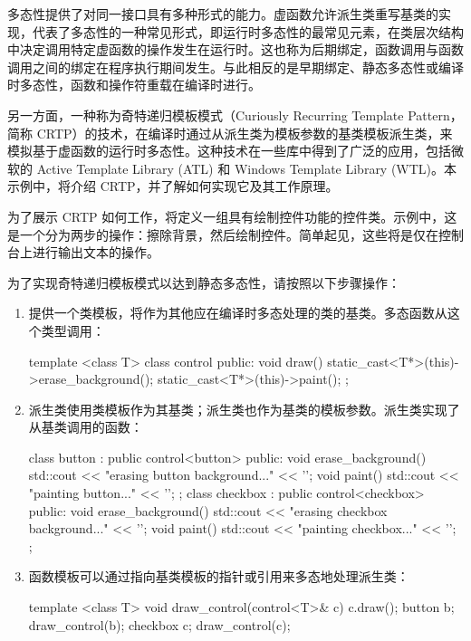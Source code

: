 
多态性提供了对同一接口具有多种形式的能力。虚函数允许派生类重写基类的实现，代表了多态性的一种常见形式，即运行时多态性的最常见元素，在类层次结构中决定调用特定虚函数的操作发生在运行时。这也称为后期绑定，函数调用与函数调用之间的绑定在程序执行期间发生。与此相反的是早期绑定、静态多态性或编译时多态性，函数和操作符重载在编译时进行。

另一方面，一种称为奇特递归模板模式（Curiously Recurring Template Pattern，简称 CRTP）的技术，在编译时通过从派生类为模板参数的基类模板派生类，来模拟基于虚函数的运行时多态性。这种技术在一些库中得到了广泛的应用，包括微软的 Active Template Library (ATL) 和 Windows Template Library (WTL)。本示例中，将介绍 CRTP，并了解如何实现它及其工作原理。


为了展示 CRTP 如何工作，将定义一组具有绘制控件功能的控件类。示例中，这是一个分为两步的操作：擦除背景，然后绘制控件。简单起见，这些将是仅在控制台上进行输出文本的操作。


为了实现奇特递归模板模式以达到静态多态性，请按照以下步骤操作：

\begin{enumerate}
\item
提供一个类模板，将作为其他应在编译时多态处理的类的基类。多态函数从这个类型调用：

\begin{cpp}
template <class T>
class control
{
    public:
    void draw()
    {
        static_cast<T*>(this)->erase_background();
        static_cast<T*>(this)->paint();
    }
};
\end{cpp}

\item
派生类使用类模板作为其基类；派生类也作为基类的模板参数。派生类实现了从基类调用的函数：

\begin{cpp}
class button : public control<button>
{
public:
    void erase_background()
    {
        std::cout << "erasing button background..." << '\n';
    }
    void paint()
    {
        std::cout << "painting button..." << '\n';
    }
};
class checkbox : public control<checkbox>
{
public:
    void erase_background()
    {
        std::cout << "erasing checkbox background..."
        << '\n';
    }
    void paint()
    {
        std::cout << "painting checkbox..." << '\n';
    }
};
\end{cpp}

\item
函数模板可以通过指向基类模板的指针或引用来多态地处理派生类：

\begin{cpp}
template <class T>
void draw_control(control<T>& c)
{
    c.draw();
}
button b;
draw_control(b);
checkbox c;
draw_control(c);
\end{cpp}
\end{enumerate}


